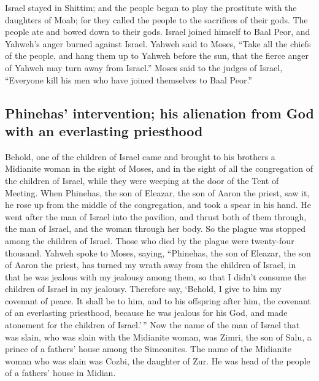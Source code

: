  Israel stayed in Shittim; and the people began to play
the prostitute with the daughters of Moab;  for they
called the people to the sacrifices of their gods. The people ate and
bowed down to their gods.  Israel joined himself to Baal
Peor, and Yahweh's anger burned against Israel.  Yahweh
said to Moses, ``Take all the chiefs of the people, and hang them up to
Yahweh before the sun, that the fierce anger of Yahweh may turn away
from Israel.''  Moses said to the judges of Israel,
``Everyone kill his men who have joined themselves to Baal Peor.''

\hypertarget{phinehas-intervention-his-alienation-from-god-with-an-everlasting-priesthood}{%
\subsection{Phinehas' intervention; his alienation from God with an
everlasting
priesthood}\label{phinehas-intervention-his-alienation-from-god-with-an-everlasting-priesthood}}

 Behold, one of the children of Israel came and brought to
his brothers a Midianite woman in the sight of Moses, and in the sight
of all the congregation of the children of Israel, while they were
weeping at the door of the Tent of Meeting.  When
Phinehas, the son of Eleazar, the son of Aaron the priest, saw it, he
rose up from the middle of the congregation, and took a spear in his
hand.  He went after the man of Israel into the pavilion,
and thrust both of them through, the man of Israel, and the woman
through her body. So the plague was stopped among the children of
Israel.  Those who died by the plague were twenty-four
thousand.  Yahweh spoke to Moses, saying, 
``Phinehas, the son of Eleazar, the son of Aaron the priest, has turned
my wrath away from the children of Israel, in that he was jealous with
my jealousy among them, so that I didn't consume the children of Israel
in my jealousy.  Therefore say, `Behold, I give to him my
covenant of peace.  It shall be to him, and to his
offspring after him, the covenant of an everlasting priesthood, because
he was jealous for his God, and made atonement for the children of
Israel.'\,''  Now the name of the man of Israel that was
slain, who was slain with the Midianite woman, was Zimri, the son of
Salu, a prince of a fathers' house among the Simeonites. 
The name of the Midianite woman who was slain was Cozbi, the daughter of
Zur. He was head of the people of a fathers' house in Midian.

